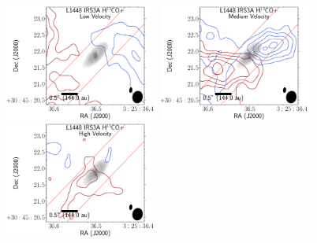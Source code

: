 \begin{figure}[H]
\begin{center}
   \includegraphics[width=0.45\textwidth]{img/L1448IRS3B_H13COp_image_taper400k__low-irs3a.pdf}
   \includegraphics[width=0.45\textwidth]{img/L1448IRS3B_H13COp_image_taper400k__medium-irs3a.pdf}
   \includegraphics[width=0.45\textwidth]{img/L1448IRS3B_H13COp_image_taper400k__high-irs3a.pdf} %
\end{center}

\end{figure}
